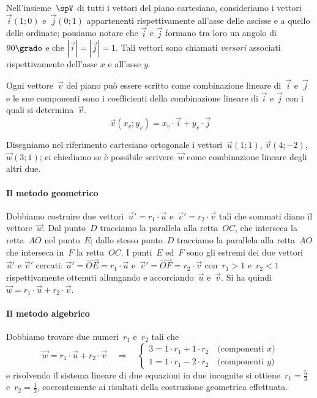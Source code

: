 Nell'insieme~$\spV$ di tutti i vettori del piano cartesiano, consideriamo i vettori~$\vec{i}(1;0)$ e~$\vec{j}(0;1)$ appartenenti
rispettivamente all'asse delle ascisse e a quello delle ordinate; possiamo notare che $\vec{i}$ e $\vec{j}$ formano tra loro un angolo di $90\grado$ e che $|\vec{i}|=|\vec{j}|=1$. Tali vettori sono chiamati \emph{versori} associati rispettivamente dell'asse $x$ e all'asse $y$.

Ogni vettore~$\vec{v}$ del piano può essere scritto come combinazione lineare di~$\vec{i}$ e~$\vec{j}$ e le sue componenti sono i coefficienti
della combinazione lineare di $\vec{i}$ e $\vec{j}$ con i quali si determina~$\vec{v}$.
\[\vec{v}(x_v;y_v)=x_v \cdot \vec{i}+y_v \cdot \vec{j}\]

\ovalbox{\risolvi \ref{ese:F.7}}

\begin{exrig}
\begin{esempio}
Disegniamo nel riferimento cartesiano ortogonale i vettori~$\vec{u}(1;1)$, $\vec{v}(4;-2)$, $\vec{w}(3;1)$; ci chiediamo se è possibile scrivere~$\vec{w}$
come combinazione lineare degli altri due.
\begin{center}
 
\end{center}


\paragraph{Il metodo geometrico} Dobbiamo costruire due vettori~$\vec{u}'=r_1 \cdot \vec{u}$ e~$\vec{v}'=r_2 \cdot \vec{v}$ tali che sommati diano
il vettore~$\vec{w}$. Dal punto~$D$ tracciamo la parallela alla retta~$OC$, che interseca la retta~$AO$ nel punto~$E$; dallo stesso punto~$D$
tracciamo la parallela alla retta~$AO$ che interseca in~$F$ la retta~$OC$. I punti~$E$ ed~$F$ sono gli
estremi dei due vettori~$\vec{u}'$ e $\vec{v}'$ cercati: $\vec{u}'=\overrightarrow{OE}=r_1 \cdot \vec{u}$ e~$\vec{v}'=\overrightarrow{OF}=r_2 \cdot \vec{v}$ con~$r_1>1$ e~$r_2<1$ rispettivamente ottenuti
allungando e accorciando~$\vec{u}$ e~$\vec{v}$. Si ha quindi~$\vec{w}=r_1 \cdot \vec{u} + r_2 \cdot \vec{v}$.

\paragraph{Il metodo algebrico} Dobbiamo trovare due numeri~$r_1$ e~$r_2$ tali che
\[ \vec{w}=r_1 \cdot \vec{u}+r_2 \cdot \vec{v} \quad\Rightarrow\quad
\left\{\begin{array}{l}
3=1 \cdot r_1+1 \cdot r_2 \quad\text{(componenti }x\text{)} \\
1=1 \cdot r_1-2 \cdot r_2 \quad\text{(componenti }y\text{)}
\end{array}\right. \]
e risolvendo il sistema lineare di due equazioni in due incognite si ottiene~$r_1=\frac{5}{3}$ e~$r_2=\frac{1}{3}$, coerentemente ai risultati della costruzione geometrica effettuata.
\end{esempio}
\end{exrig}

